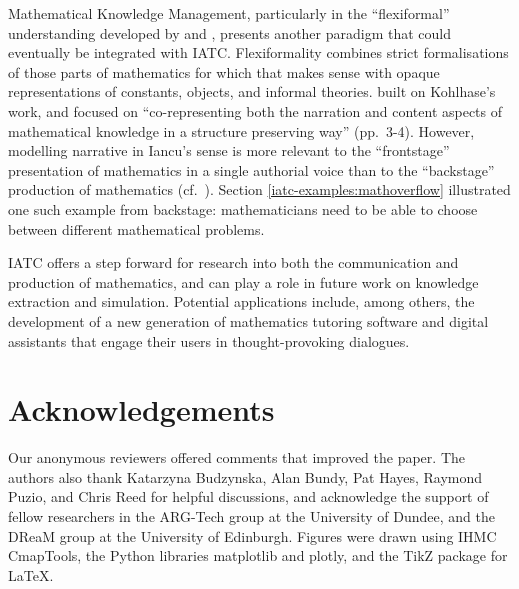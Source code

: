 \documentclass[smallextended,oneside]{svjour3}       %
\newcommand\nothing[1]{#1}
\let\paragraph\nothing
\begin{document}
{\paragraph{Mathematical Knowledge Management, particularly in the ``flexiformal'' understanding developed by \citet{kohlhase2012flexiformalist} and \citet{kohlhase2017mathematical}, presents another paradigm that could eventually be integrated with IATC.}
Flexiformality combines strict formalisations of those parts of
mathematics for which that makes sense with opaque representations of
constants, objects, and informal theories.  \citet{iancu-thesis} built
on Kohlhase's work, and focused on ``co-representing both the
narration and content aspects of mathematical knowledge in a structure
preserving way'' (pp.~3-4).  However, modelling narrative in Iancu's
sense is more relevant to the ``frontstage'' presentation of
mathematics in a single authorial voice than to the ``backstage''
production of mathematics (cf.~\citet{hersh1991mathematics}).  Section
\ref{iatc-examples:mathoverflow} illustrated one such example from
backstage: mathematicians need to be able to choose between different
mathematical problems.

\paragraph{IATC offers a step forward for research into both the communication and production of mathematics, and can play a role in future work on knowledge extraction and simulation.}
Potential applications include, among others, the development of a new
generation of mathematics tutoring software and digital assistants
that engage their users in thought-provoking dialogues.

\section{Acknowledgements}
Our anonymous reviewers offered comments that improved the paper.
The authors also thank Katarzyna Budzynska, Alan Bundy, Pat Hayes, Raymond Puzio, and Chris Reed for helpful discussions, and acknowledge the support of fellow researchers in the ARG-Tech group at the University of Dundee, and the DReaM group at the University of Edinburgh.  Figures were drawn using IHMC CmapTools, the Python libraries matplotlib and plotly, and the TikZ package for \LaTeX.


}
\end{document}
